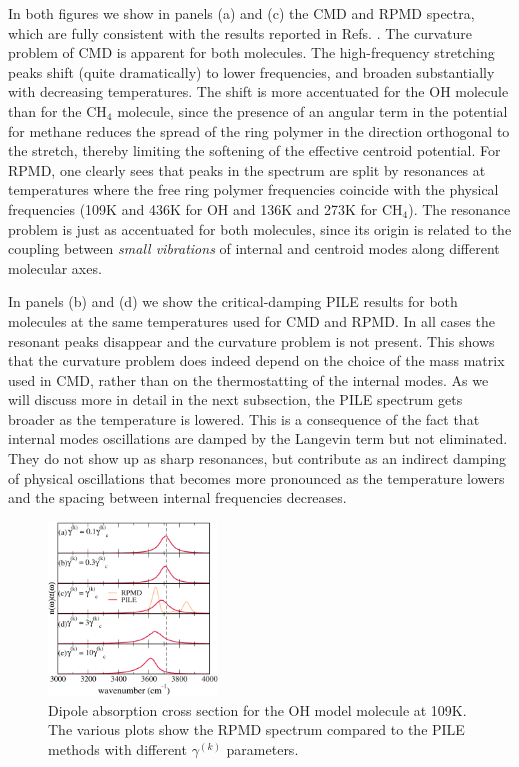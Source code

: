 \documentclass[aps,prb,superscriptaddress,amsmath,amssymb,showpacs,twocolumn]{revtex4}
\begin{document}
In both figures we show in panels (a) and (c) the CMD and RPMD 
spectra, which are fully consistent with the results reported 
in Refs. \cite{witt+09jcp, ivanov+10jpc}.
The curvature problem of CMD is apparent for both molecules.
The high-frequency stretching peaks shift (quite dramatically)
to lower frequencies, and broaden substantially with 
decreasing temperatures.
The shift is more accentuated for the OH molecule than for the
CH$_4$ molecule, since the presence of an angular term in the potential 
for methane reduces the spread of the ring polymer in the
direction orthogonal to the stretch, thereby limiting the 
softening of the effective centroid potential.
For RPMD, one clearly sees that peaks in the spectrum are
split by resonances at temperatures where the free ring polymer frequencies
coincide with the physical frequencies (109K and 436K for
OH and 136K and 273K for CH$_4$). The resonance
problem is just as accentuated for both molecules, since its origin is 
related to the coupling between \emph{small vibrations} of internal and centroid
modes along different molecular axes.


In panels (b) and (d) we show the critical-damping PILE results for both 
molecules at the same temperatures used for CMD and RPMD. 
In all cases the resonant peaks disappear and the curvature problem is not present. 
This shows that the curvature problem does indeed depend on the choice
of the mass matrix used in CMD, 
rather than on the thermostatting of the internal modes.
As we will discuss more in detail in the next subsection, the PILE
spectrum gets broader as the temperature is lowered.
This is a consequence of the fact that internal modes oscillations
are damped by the Langevin term but not eliminated. They do not
show up as sharp resonances, but contribute as an indirect 
damping of physical oscillations that becomes more pronounced as 
the temperature lowers and the spacing between internal frequencies 
decreases.

\begin{figure}[htbp]
\centering
\includegraphics[width=0.4\textwidth]{figures/oh_rpmdvspiledampings_109K.pdf}
\caption{Dipole absorption cross section for the OH 
model molecule at 109K. The various plots show the RPMD spectrum compared to the 
PILE methods with different $\gamma^{(k)}$ parameters.}
\label{fig:oh-rpmd-pile-dampings}
\end{figure}
\end{document}
